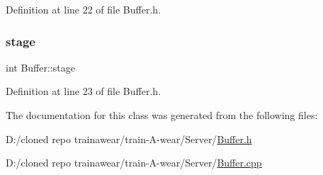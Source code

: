 Definition at line 22 of file Buffer.\+h.

\mbox{\label{class_buffer_a18d933c855fdd62178d991d258206b80}} 
\subsubsection{\texorpdfstring{stage}{stage}}
{\footnotesize\ttfamily int Buffer\+::stage\hspace{0.3cm}{\ttfamily [private]}}



Definition at line 23 of file Buffer.\+h.



The documentation for this class was generated from the following files\+:\begin{DoxyCompactItemize}
\item 
D\+:/cloned repo trainawear/train-\/\+A-\/wear/\+Server/\mbox{\hyperlink{_buffer_8h}{Buffer.\+h}}\item 
D\+:/cloned repo trainawear/train-\/\+A-\/wear/\+Server/\mbox{\hyperlink{_buffer_8cpp}{Buffer.\+cpp}}\end{DoxyCompactItemize}
